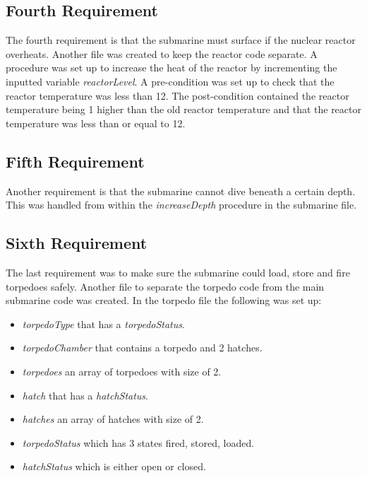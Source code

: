 \subsection{Fourth Requirement}
The fourth requirement is that the submarine must surface if the nuclear reactor overheats. Another file was created to keep the reactor code separate. A procedure was set up to increase the heat of the reactor by incrementing the inputted variable \textit{reactorLevel}. A pre-condition was set up to check that the reactor temperature was less than 12. The post-condition contained the reactor temperature being 1 higher than the old reactor temperature and that the reactor temperature was less than or equal to 12.

\subsection{Fifth Requirement}
Another requirement is that the submarine cannot dive beneath a certain depth. This was handled from within the \textit{increaseDepth} procedure in the submarine file.

\subsection{Sixth Requirement}
The last requirement was to make sure the submarine could load, store and fire torpedoes safely. Another file to separate the torpedo code from the main submarine code was created. In the torpedo file the following was set up: \begin{itemize}
	\item \textit{torpedoType} that has a \textit{torpedoStatus}. 
	\item \textit{torpedoChamber} that contains a torpedo and 2 hatches.
	\item \textit{torpedoes} an array of torpedoes with size of 2.
	\item \textit{hatch} that has a \textit{hatchStatus}.
	\item \textit{hatches} an array of hatches with size of 2.
	\item \textit{torpedoStatus} which has 3 states fired, stored, loaded.
	\item \textit{hatchStatus} which is either open or closed.
\end{itemize}

